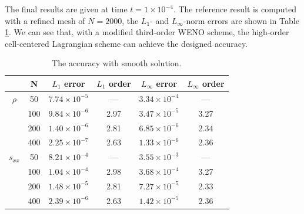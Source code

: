 \documentclass{article}
\numberwithin{equation}{section}
\numberwithin{table}{section}
\begin{document}
The final results are given at time $t = 1 \times 10^{-4}$. The reference  result is computed with a refined mesh of $N = 2000$, the  $L_1 $- and $ L_\infty$-norm  errors  are shown in Table \ref{tab:1}. We can see that,  with a  modified third-order WENO scheme, the high-order cell-centered Lagrangian scheme can  achieve the designed  accuracy.

\begin{table}[htbp]
  \small
  \centering
\setlength{\belowcaptionskip}{10pt}
\caption{\small The accuracy with smooth solution.}
  \begin{tabular}{cccccc}
	\toprule
	        & N       & $L_1$ error  & $L_1$ order & $L_{\infty}$ error & $L_{\infty}$ order \\
	\midrule
	$ \rho $      &50           &  $7.74\times 10^{-5}$     &---         &  $3.34\times 10^{-4}$         & ---  \\
			      &100          &  $9.84\times 10^{-6}$     &2.97        &  $3.47\times 10^{-5}$         & 3.27 \\
	              &200          &  $1.40\times 10^{-6}$     &2.81        &  $6.85\times 10^{-6}$		 & 2.34 \\
				  &400          &  $2.25\times 10^{-7}$     &2.63        &  $1.33\times 10^{-6}$         & 2.36 \\
	$s_{xx}$     &50           &  $8.21\times 10^{-4}$     &---         &  $3.55\times 10^{-3}$         & ---  \\
				  &100          &  $1.04\times 10^{-4}$     &2.98        &  $3.68\times 10^{-4}$         & 3.27 \\
				  &200          &  $1.48\times 10^{-5}$     &2.81        &  $7.27\times 10^{-5}$         & 2.33 \\
				  &400          &  $2.39\times 10^{-6}$     &2.63        &  $1.42\times 10^{-5}$         & 2.36 \\
	\bottomrule
	\end{tabular}
\label{tab:1}
\end{table}
\end{document}
